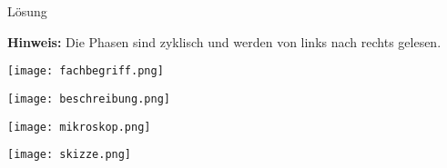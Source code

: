 \documentclass[fleqn,a4paper,12pt,titlepage,headsepline]{scrartcl}
\begin{document}
	\begin{center}
	\begin{huge}
	\noindent Lösung
	\end{huge}
	\end{center}
\noindent \textbf{Hinweis:}
Die Phasen sind zyklisch und werden von links nach rechts gelesen.
\begin{center}
					\texttt{[image: fachbegriff.png]} 				\end{center}
	\begin{center}
					\texttt{[image: beschreibung.png]} 				\end{center}
	\begin{center}
					\texttt{[image: mikroskop.png]} 				\end{center}	
	\begin{center}
					\texttt{[image: skizze.png]} 				\end{center}
\newpage

	
\end{document}
